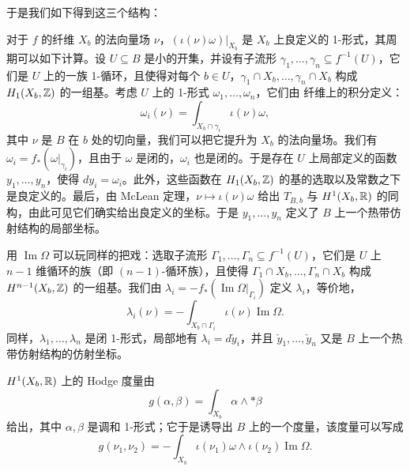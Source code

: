 于是我们如下得到这三个结构：

对于 $f$ 的纤维 $X_b$ 的法向量场 $\nu$，$(\iota(\nu)\omega)|_{X_b}$ 是 $X_b$ 上良定义的 1-形式，其周期可以如下计算。设 $U\subseteq B$ 是小的开集，并设有子流形 $\gamma_1,\dots,\gamma_n\subseteq f^{-1}(U)$，它们是 $U$ 上的一族 1-循环，且使得对每个 $b\in U$，$\gamma_1\cap X_b,\dots,\gamma_n\cap X_b$ 构成 $H_1(X_b,\mathbb{Z})$ 的一组基。考虑 $U$ 上的 1-形式 $\omega_1,\dots,\omega_n$，它们由
纤维上的积分定义：
\begin{equation*}
\omega_i(\nu)=\int_{X_b\cap\gamma_i}\iota(\nu)\omega,
\end{equation*}
其中 $\nu$ 是 $B$ 在 $b$ 处的切向量，我们可以把它提升为 $X_b$ 的法向量场。我们有 $\omega_i=f_*(\omega|_{\gamma_i})$，且由于 $\omega$ 是闭的，$\omega_i$ 也是闭的。于是存在 $U$ 上局部定义的函数 $y_1,\dots,y_n$，使得 $dy_i=\omega_i$。此外，这些函数在 $H_1(X_b,\mathbb{Z})$ 的基的选取以及常数之下是良定义的。最后，由 McLean 定理，$\nu\mapsto\iota(\nu)\omega$ 给出 $T_{B,b}$ 与 $H^1(X_b,\mathbb{R})$ 的同构，由此可见它们确实给出良定义的坐标。于是 $y_1,\dots,y_n$ 定义了 $B$ 上一个热带仿射结构的局部坐标。


用 $\operatorname{Im}\Omega$ 可以玩同样的把戏：选取子流形 $\Gamma_1,\dots,\Gamma_n\subseteq f^{-1}(U)$，它们是 $U$ 上 $n-1$ 维循环的族（即 $(n-1)$-循环族），且使得 $\Gamma_1\cap X_b,\dots,\Gamma_n\cap X_b$ 构成 $H^{n-1}(X_b,\mathbb{Z})$ 的一组基。我们由 $\lambda_i=-f_*(\operatorname{Im}\Omega|_{\Gamma_i})$ 定义 $\lambda_i$，等价地，
\begin{equation*}
\lambda_i(\nu)=-\int_{X_b\cap\Gamma_i}\iota(\nu)\operatorname{Im}\Omega.
\end{equation*}
同样，$\lambda_1,\dots,\lambda_n$ 是闭 1-形式，局部地有 $\lambda_i=d\check y_i$，并且 $\check y_1,\dots,\check y_n$ 又是 $B$ 上一个热带仿射结构的仿射坐标。


$H^1(X_b,\mathbb{R})$ 上的 Hodge 度量由
\begin{equation*}
g(\alpha,\beta)=\int_{X_b}\alpha\wedge*\beta
\end{equation*}
给出，其中 $\alpha,\beta$ 是调和 1-形式；它于是诱导出 $B$ 上的一个度量，该度量可以写成
\begin{equation*}
g(\nu_1,\nu_2)=-\int_{X_b}\iota(\nu_1)\omega\wedge\iota(\nu_2)\operatorname{Im}\Omega.
\end{equation*}

